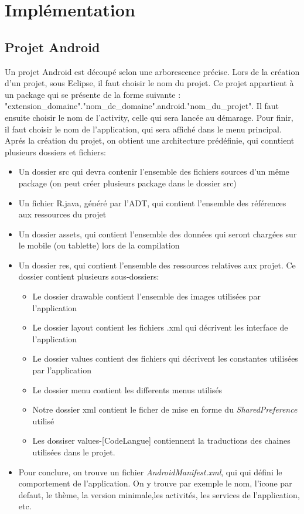 \chapter{Implémentation}
\section{Projet Android}
Un projet Android est découpé selon une arborescence précise.
Lors de la création d'un projet, sous Eclipse, il faut choisir le nom du projet.
Ce projet appartient à un package qui se présente de la forme suivante :
"extension\_domaine"."nom\_de\_domaine".android."nom\_du\_projet". Il faut
ensuite choisir le nom de l'activity, celle qui sera lancée au démarage. Pour finir, il
faut choisir le nom de l'application, qui sera affiché dans le menu principal.
Aprés la création du projet, on obtient une architecture prédéfinie, qui
conntient plusieurs dossiers et fichiers:
\begin{itemize}
  \item Un dossier src qui devra contenir l'ensemble des fichiers sources d'un
  même package (on peut créer plusieurs package dans le dossier src)
  \item Un fichier R.java, généré par l'ADT, qui contient l'ensemble des
  références aux ressources du projet
  \item Un dossier assets, qui contient l'ensemble des données qui seront
  chargées sur le mobile (ou tablette) lors de la compilation
  \item Un dossier res, qui contient l'ensemble des ressources relatives aux
  projet. Ce dossier contient plusieurs sous-dossiers:
  \begin{itemize}
    \item Le dossier drawable contient l'ensemble des images utilisées par
    l'application
    \item Le dossier layout contient les fichiers .xml qui décrivent les
    interface de l'application
    \item Le dossier values contient des fichiers qui décrivent les constantes
    utilisées par l'application
    \item Le dossier menu contient les differents menus utilisés
    \item Notre dossier xml contient le ficher de mise en forme du
    \textit{SharedPreference} utilisé
    \item Les dossiser values-[CodeLangue] contiennent la traductions des
    chaines utilisées dans le projet.
   \end{itemize}
   \item Pour conclure, on trouve un fichier \textit{AndroidManifest.xml}, qui
   qui défini le comportement de l'application. On y trouve par exemple le nom,
   l'icone par defaut, le thème, la version minimale,les activités, les services
   de l'application, etc.
\end{itemize}

